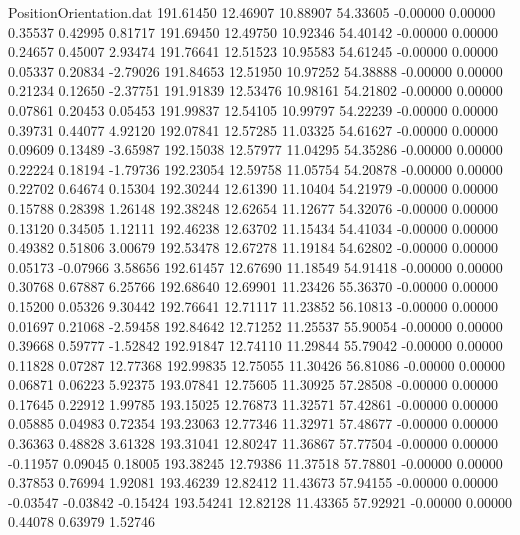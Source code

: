 \begin{filecontents}{PositionOrientation.dat}
 191.61450   12.46907   10.88907    54.33605   -0.00000    0.00000    0.35537    0.42995    0.81717
 191.69450   12.49750   10.92346    54.40142   -0.00000    0.00000    0.24657    0.45007    2.93474
 191.76641   12.51523   10.95583    54.61245   -0.00000    0.00000    0.05337    0.20834   -2.79026
 191.84653   12.51950   10.97252    54.38888   -0.00000    0.00000    0.21234    0.12650   -2.37751
 191.91839   12.53476   10.98161    54.21802   -0.00000    0.00000    0.07861    0.20453    0.05453
 191.99837   12.54105   10.99797    54.22239   -0.00000    0.00000    0.39731    0.44077    4.92120
 192.07841   12.57285   11.03325    54.61627   -0.00000    0.00000    0.09609    0.13489   -3.65987
 192.15038   12.57977   11.04295    54.35286   -0.00000    0.00000    0.22224    0.18194   -1.79736
 192.23054   12.59758   11.05754    54.20878   -0.00000    0.00000    0.22702    0.64674    0.15304
 192.30244   12.61390   11.10404    54.21979   -0.00000    0.00000    0.15788    0.28398    1.26148
 192.38248   12.62654   11.12677    54.32076   -0.00000    0.00000    0.13120    0.34505    1.12111
 192.46238   12.63702   11.15434    54.41034   -0.00000    0.00000    0.49382    0.51806    3.00679
 192.53478   12.67278   11.19184    54.62802   -0.00000    0.00000    0.05173   -0.07966    3.58656
 192.61457   12.67690   11.18549    54.91418   -0.00000    0.00000    0.30768    0.67887    6.25766
 192.68640   12.69901   11.23426    55.36370   -0.00000    0.00000    0.15200    0.05326    9.30442
 192.76641   12.71117   11.23852    56.10813   -0.00000    0.00000    0.01697    0.21068   -2.59458
 192.84642   12.71252   11.25537    55.90054   -0.00000    0.00000    0.39668    0.59777   -1.52842
 192.91847   12.74110   11.29844    55.79042   -0.00000    0.00000    0.11828    0.07287   12.77368
 192.99835   12.75055   11.30426    56.81086   -0.00000    0.00000    0.06871    0.06223    5.92375
 193.07841   12.75605   11.30925    57.28508   -0.00000    0.00000    0.17645    0.22912    1.99785
 193.15025   12.76873   11.32571    57.42861   -0.00000    0.00000    0.05885    0.04983    0.72354
 193.23063   12.77346   11.32971    57.48677   -0.00000    0.00000    0.36363    0.48828    3.61328
 193.31041   12.80247   11.36867    57.77504   -0.00000    0.00000   -0.11957    0.09045    0.18005
 193.38245   12.79386   11.37518    57.78801   -0.00000    0.00000    0.37853    0.76994    1.92081
 193.46239   12.82412   11.43673    57.94155   -0.00000    0.00000   -0.03547   -0.03842   -0.15424
 193.54241   12.82128   11.43365    57.92921   -0.00000    0.00000    0.44078    0.63979    1.52746

\end{filecontents}
